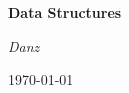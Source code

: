 \documentclass[landscape, letterpaper, openany]{book}
\begin{document}
\begin{titlepage}
    \centering
    \vspace*{5cm}
    {\Huge\bfseries Data Structures\par}
    \vspace{2cm}
    {\Large\itshape Danz\par}
    \vfill
    \today
\end{titlepage}

\tableofcontents 

\end{document}
